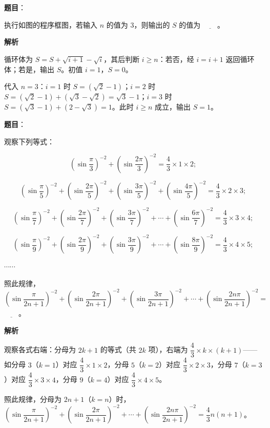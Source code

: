 \begin{answer}

\textbf{题目}：

执行如图的程序框图，若输入 \(n\) 的值为 3，则输出的 \(S\) 的值为 \(\underline{\qquad}\)。
\nopagebreak[4]
\begin{center}\end{center}
\nopagebreak[4]
\textbf{解析}

循环体为 \(S=S+\sqrt{i+1}-\sqrt{i}\)，其后判断 \(i\geqslant n\)：若否，经 \(i=i+1\) 返回循环体；若是，输出 \(S\)。初值 \(i=1\)，\(S=0\)。

代入 \(n=3\)：\(i=1\) 时 \(S=(\sqrt{2}-1)\)；\(i=2\) 时 \(S=(\sqrt{2}-1)+(\sqrt{3}-\sqrt{2})=\sqrt{3}-1\)；\(i=3\) 时 \(S=(\sqrt{3}-1)+(2-\sqrt{3})=1\)。此时 \(i\geqslant n\) 成立，输出 \(S=1\)。


\end{answer}
\begin{answer}

\textbf{题目}：

观察下列等式：

\nopagebreak[4]
\[
\left(\sin\dfrac{\pi}{3}\right)^{-2}+\left(\sin\dfrac{2\pi}{3}\right)^{-2}=\dfrac{4}{3}\times 1\times 2;
\]

\nopagebreak[4]
\[
\left(\sin\dfrac{\pi}{5}\right)^{-2}+\left(\sin\dfrac{2\pi}{5}\right)^{-2}+\left(\sin\dfrac{3\pi}{5}\right)^{-2}+\left(\sin\dfrac{4\pi}{5}\right)^{-2}=\dfrac{4}{3}\times 2\times 3;
\]

\nopagebreak[4]
\[
\left(\sin\dfrac{\pi}{7}\right)^{-2}+\left(\sin\dfrac{2\pi}{7}\right)^{-2}+\left(\sin\dfrac{3\pi}{7}\right)^{-2}+\cdots+\left(\sin\dfrac{6\pi}{7}\right)^{-2}=\dfrac{4}{3}\times 3\times 4;
\]

\nopagebreak[4]
\[
\left(\sin\dfrac{\pi}{9}\right)^{-2}+\left(\sin\dfrac{2\pi}{9}\right)^{-2}+\left(\sin\dfrac{3\pi}{9}\right)^{-2}+\cdots+\left(\sin\dfrac{8\pi}{9}\right)^{-2}=\dfrac{4}{3}\times 4\times 5;
\]

\(\cdots\cdots\)

照此规律，\(\left(\sin\dfrac{\pi}{2n+1}\right)^{-2}+\left(\sin\dfrac{2\pi}{2n+1}\right)^{-2}+\left(\sin\dfrac{3\pi}{2n+1}\right)^{-2}+\cdots+\left(\sin\dfrac{2n\pi}{2n+1}\right)^{-2}=\) \(\underline{\qquad}\)。

\textbf{解析}

观察各式右端：分母为 \(2k+1\) 的等式（共 \(2k\) 项），右端为 \(\dfrac{4}{3}\times k\times(k+1)\)——如分母 \(3\)（\(k=1\)）对应 \(\dfrac{4}{3}\times 1\times 2\)，分母 \(5\)（\(k=2\)）对应 \(\dfrac{4}{3}\times 2\times 3\)，分母 \(7\)（\(k=3\)）对应 \(\dfrac{4}{3}\times 3\times 4\)，分母 \(9\)（\(k=4\)）对应 \(\dfrac{4}{3}\times 4\times 5\)。

照此规律，分母为 \(2n+1\)（\(k=n\)）时，\(\left(\sin\dfrac{\pi}{2n+1}\right)^{-2}+\left(\sin\dfrac{2\pi}{2n+1}\right)^{-2}+\cdots+\left(\sin\dfrac{2n\pi}{2n+1}\right)^{-2}=\dfrac{4}{3}n(n+1)\)。


\end{answer}
